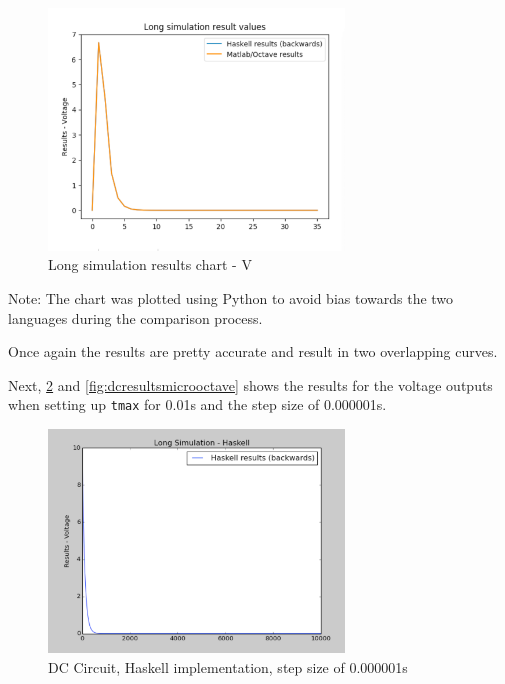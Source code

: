 \begin{figure}[H]
   \centering
   \includegraphics[width=0.7\textwidth]{img/voltageplotlong.png}
   \caption{Long simulation results chart - V}
   \label{reschart2}
\end{figure}

Note: The chart was plotted using Python to avoid bias towards the two languages during the comparison process.

Once again the results are pretty accurate and result in two overlapping curves.

Next, \cref{fig:dcresultsmicro} and \cref{fig:dcresultsmicrooctave} shows the results for the voltage outputs when setting up \lstinline!tmax! for 0.01s and the step size of 0.000001s.

\begin{figure}[H]
   \centering
   \includegraphics[width=0.7\textwidth]{img/dcresultsmicro.png}
   \caption{DC Circuit, Haskell implementation, step size of 0.000001s}
   \label{fig:dcresultsmicro}
\end{figure}


